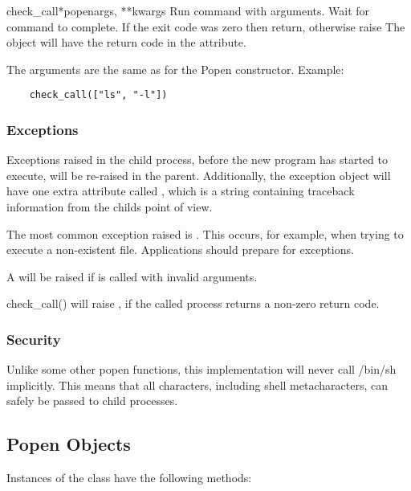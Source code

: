 \begin{funcdesc}{check_call}{*popenargs, **kwargs}
Run command with arguments.  Wait for command to complete. If the exit
code was zero then return, otherwise raise 
The  object will have the return code in the
 attribute.

The arguments are the same as for the Popen constructor.  Example:

\begin{verbatim}
    check_call(["ls", "-l"])
\end{verbatim}
\end{funcdesc}

\subsubsection{Exceptions}

Exceptions raised in the child process, before the new program has
started to execute, will be re-raised in the parent.  Additionally,
the exception object will have one extra attribute called
, which is a string containing traceback
information from the childs point of view.

The most common exception raised is .  This occurs,
for example, when trying to execute a non-existent file.  Applications
should prepare for  exceptions.

A  will be raised if  is called
with invalid arguments.

check_call() will raise , if the called
process returns a non-zero return code.


\subsubsection{Security}

Unlike some other popen functions, this implementation will never call
/bin/sh implicitly.  This means that all characters, including shell
metacharacters, can safely be passed to child processes.


\subsection{Popen Objects}

Instances of the  class have the following methods:

